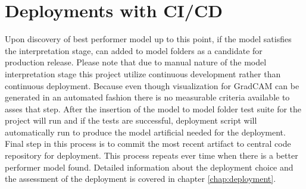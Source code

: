 \section{Deployments with CI/CD}
Upon discovery of best performer model up to this point, if the model satisfies the interpretation stage, can added to model folders as a candidate for production release.
Please note that due to manual nature of the model interpretation stage this project utilize continuous development rather than continuous deployment.
Because even though visualization for GradCAM can be generated in an automated fashion there is no measurable criteria available to asses that step.
After the insertion of the model to model folder test suite for the project will run and if the tests are successful, deployment script will automatically run to produce the model artificial needed for the deployment.
Final step in this process is to commit the most recent artifact to central code repository for deployment.
This process repeats ever time when there is a better performer model found.
Detailed information about the deployment choice and the assessment of the deployment is covered in chapter \ref{chap:deployment}.
